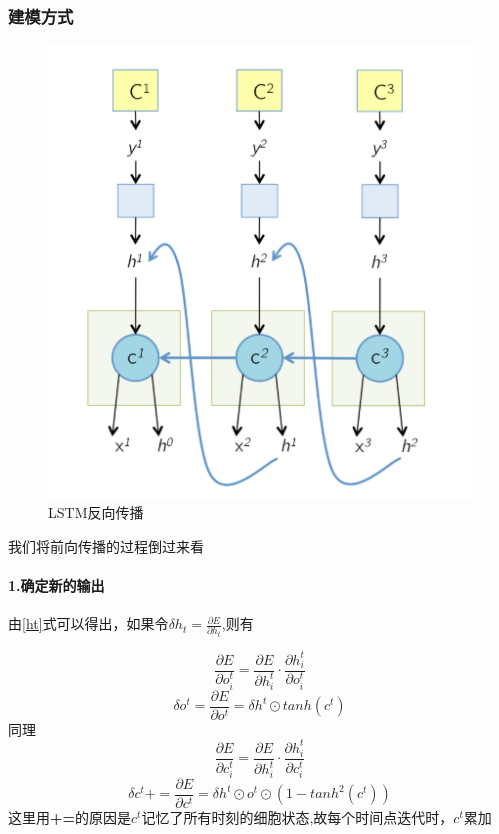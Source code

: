 \documentclass[UTF8]{ctexart}
\begin{document}
\subsubsection{建模方式}
\begin{figure}[!htbp]
    \centering
    \includegraphics[scale = 0.6]{p7.png}
    \caption{LSTM反向传播\cite{3}}
\end{figure}
我们将前向传播的过程倒过来看
\paragraph*{1.确定新的输出}
由\ref{ht}式可以得出，如果令$\delta h_t = \frac{\partial E}{\partial h_t}$,则有

\begin{equation}
\frac{\partial E}{\partial o_i^t} = \frac{\partial E}{\partial h_i^t} \cdot \frac{\partial h_i^t}{\partial o_i^t} 
\end{equation}
\begin{equation}
\delta o^t = \frac{\partial E}{\partial o^t} =\delta h^t \odot tanh(c^t)  
\end{equation}
同理
\begin{equation}
\frac{\partial E}{\partial c_i^t} = \frac{\partial E}{\partial h_i^t} \cdot \frac{\partial h_i^t}{\partial c_i^t}
\end{equation}
\begin{equation}
\delta c^t  += \frac{\partial E}{\partial c^t} =\delta h^t \odot o^t \odot (1 - tanh^2(c^t))
\end{equation}
这里用\textbf{+=}的原因是$c^t$记忆了所有时刻的细胞状态,故每个时间点迭代时，$c^t$累加
\end{document}
